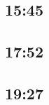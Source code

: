 \hypertarget{section}{%
\subsection{15:45}\label{section}}

\lipsum[1]

\hypertarget{section-1}{%
\subsection{17:52}\label{section-1}}

\lipsum[2]

\hypertarget{section-2}{%
\subsection{19:27}\label{section-2}}

\lipsum[3]
